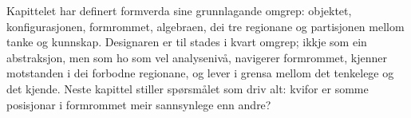 \begin{overgang}
Kapittelet har definert formverda sine grunnlagande omgrep: objektet, konfigurasjonen, formrommet, algebraen, dei tre regionane og partisjonen mellom tanke og kunnskap. Designaren er til stades i kvart omgrep; ikkje som ein abstraksjon, men som ho som vel analysenivå, navigerer formrommet, kjenner motstanden i dei forbodne regionane, og lever i grensa mellom det tenkelege og det kjende. Neste kapittel stiller spørsmålet som driv alt: kvifor er somme posisjonar i formrommet meir sannsynlege enn andre?
\end{overgang}
